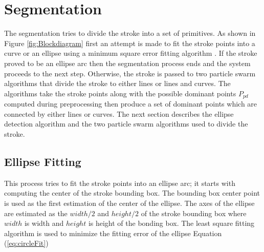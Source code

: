 \section{Segmentation}
\label{sec:Segmentation}
The segmentation tries to divide the stroke into a set of primitives. As shown in Figure \ref{fig:Blockdiagram} first an attempt is made to fit the stroke points into a curve or an ellipse using a minimum square error fitting algorithm \cite{chernov-2003}. If the stroke proved to be an ellipse arc then the segmentation process ends and the system proceeds to the next step. Otherwise, the stroke is passed to two particle swarm algorithms that divide the stroke to either lines or lines and curves. The algorithms take the stroke points along with the possible dominant points $P_{pd}$ computed during preprocessing then produce a set of dominant points which are connected by either lines or curves. The next section describes the ellipse detection algorithm and the two particle swarm algorithms used to divide the stroke.


\subsection{Ellipse Fitting }
\label{sec:EllipseDetection}

This process tries to fit the stroke points into an ellipse arc; it starts with computing the center of the stroke bounding box. The bounding box center point is used as the first estimation of the center of the ellipse. The axes of the ellipse are estimated as the $width/2$ and $height/2$ of the stroke bounding box where $width$ is width and $height$ is height of the bonding box. The least square fitting algorithm \cite{chernov-2003} is used to minimize the fitting error of the ellipse Equation (\ref{eq:circleFit})  

